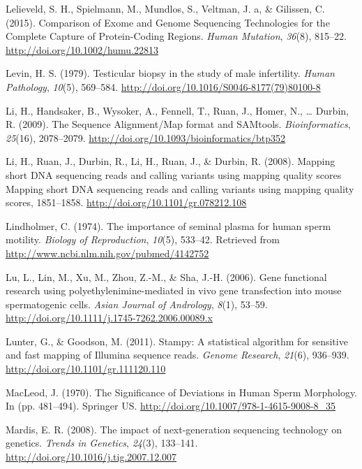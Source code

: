 \documentclass[12pt,twoside]{reedthesis}
\theoremstyle{definition}
\theoremstyle{definition}
\theoremstyle{remark}
\begin{document}
  \hypertarget{ref-Lelieveld2015}{}
  Lelieveld, S. H., Spielmann, M., Mundlos, S., Veltman, J. a, \&
  Gilissen, C. (2015). Comparison of Exome and Genome Sequencing
  Technologies for the Complete Capture of Protein-Coding Regions.
  \emph{Human Mutation}, \emph{36}(8), 815--22.
  \url{http://doi.org/10.1002/humu.22813}
  
  \hypertarget{ref-Levin1979}{}
  Levin, H. S. (1979). Testicular biopsy in the study of male infertility.
  \emph{Human Pathology}, \emph{10}(5), 569--584.
  \url{http://doi.org/10.1016/S0046-8177(79)80100-8}
  
  \hypertarget{ref-Li2009}{}
  Li, H., Handsaker, B., Wysoker, A., Fennell, T., Ruan, J., Homer, N.,
  \ldots{} Durbin, R. (2009). The Sequence Alignment/Map format and
  SAMtools. \emph{Bioinformatics}, \emph{25}(16), 2078--2079.
  \url{http://doi.org/10.1093/bioinformatics/btp352}
  
  \hypertarget{ref-Li2008}{}
  Li, H., Ruan, J., Durbin, R., Li, H., Ruan, J., \& Durbin, R. (2008).
  Mapping short DNA sequencing reads and calling variants using mapping
  quality scores Mapping short DNA sequencing reads and calling variants
  using mapping quality scores, 1851--1858.
  \url{http://doi.org/10.1101/gr.078212.108}
  
  \hypertarget{ref-Lindholmer1974}{}
  Lindholmer, C. (1974). The importance of seminal plasma for human sperm
  motility. \emph{Biology of Reproduction}, \emph{10}(5), 533--42.
  Retrieved from \url{http://www.ncbi.nlm.nih.gov/pubmed/4142752}
  
  \hypertarget{ref-Lu2006}{}
  Lu, L., Lin, M., Xu, M., Zhou, Z.-M., \& Sha, J.-H. (2006). Gene
  functional research using polyethylenimine-mediated in vivo gene
  transfection into mouse spermatogenic cells. \emph{Asian Journal of
  Andrology}, \emph{8}(1), 53--59.
  \url{http://doi.org/10.1111/j.1745-7262.2006.00089.x}
  
  \hypertarget{ref-Lunter2011}{}
  Lunter, G., \& Goodson, M. (2011). Stampy: A statistical algorithm for
  sensitive and fast mapping of Illumina sequence reads. \emph{Genome
  Research}, \emph{21}(6), 936--939.
  \url{http://doi.org/10.1101/gr.111120.110}
  
  \hypertarget{ref-MacLeod1970}{}
  MacLeod, J. (1970). The Significance of Deviations in Human Sperm
  Morphology. In (pp. 481--494). Springer US.
  \url{http://doi.org/10.1007/978-1-4615-9008-8_35}
  
  \hypertarget{ref-Mardis2008}{}
  Mardis, E. R. (2008). The impact of next-generation sequencing
  technology on genetics. \emph{Trends in Genetics}, \emph{24}(3),
  133--141. \url{http://doi.org/10.1016/j.tig.2007.12.007}
  
\end{document}
